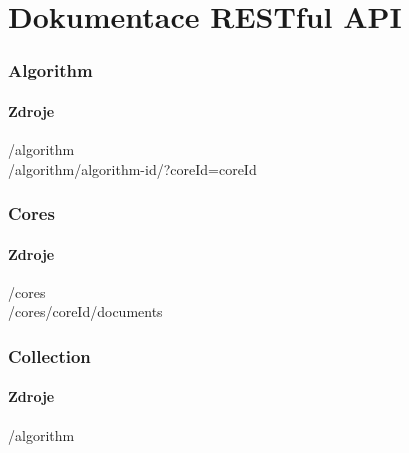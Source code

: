\documentclass[thesis=M,czech]{FITthesis}[2014/05/07]
\begin{document}



\appendix

\chapter{Dokumentace RESTful API}
\label{restfulapi}

\subsection{Algorithm}

\subsubsection{Zdroje}

\begin{description}
	\item[/algorithm]
	\item[/algorithm/{algorithm-id}/?coreId={coreId}]
\end{description}

\subsection{Cores}

\subsubsection{Zdroje}

\begin{description}
	\item[/cores]
	\item[/cores/{coreId}/documents]
\end{description}

\subsection{Collection}

\subsubsection{Zdroje}

\begin{description}
	\item[/algorithm]
	\item[]
	\item[]
\end{description}
\end{document}
